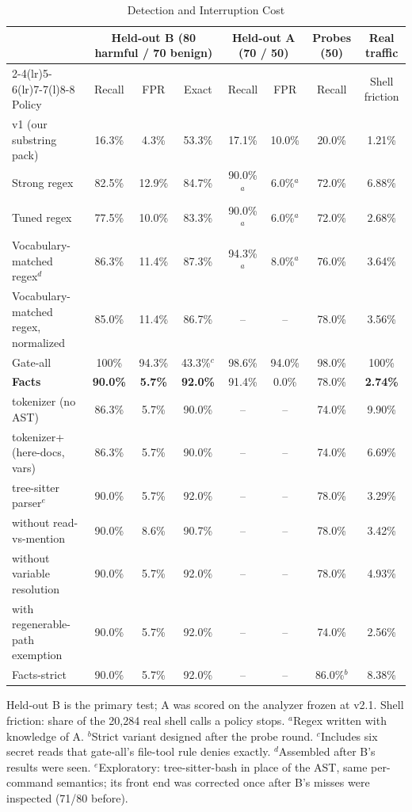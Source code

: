 \documentclass[conference]{IEEEtran}
\begin{document}
\begin{table}[t]
\caption{Detection and Interruption Cost}
\label{tab:main}
\centering\small
\begin{tabular}{@{}lccccccc@{}}
\toprule
 & \multicolumn{3}{c}{Held-out B (80 harmful / 70 benign)} & \multicolumn{2}{c}{Held-out A (70 / 50)} & Probes (50) & Real traffic \\
\cmidrule(lr){2-4}\cmidrule(lr){5-6}\cmidrule(lr){7-7}\cmidrule(l){8-8}
Policy & Recall & FPR & Exact & Recall & FPR & Recall & Shell friction \\
\midrule
v1 (our substring pack) & 16.3\% & 4.3\% & 53.3\% & 17.1\% & 10.0\% & 20.0\% & 1.21\% \\
Strong regex & 82.5\% & 12.9\% & 84.7\% & 90.0\%$^a$ & 6.0\%$^a$ & 72.0\% & 6.88\% \\
Tuned regex & 77.5\% & 10.0\% & 83.3\% & 90.0\%$^a$ & 6.0\%$^a$ & 72.0\% & 2.68\% \\
Vocabulary-matched regex$^d$ & 86.3\% & 11.4\% & 87.3\% & 94.3\%$^a$ & 8.0\%$^a$ & 76.0\% & 3.64\% \\
Vocabulary-matched regex, normalized & 85.0\% & 11.4\% & 86.7\% & -- & -- & 78.0\% & 3.56\% \\
Gate-all & 100\% & 94.3\% & 43.3\%$^c$ & 98.6\% & 94.0\% & 98.0\% & 100\% \\
\midrule
\textbf{Facts} & \textbf{90.0\%} & \textbf{5.7\%} & \textbf{92.0\%} & 91.4\% & 0.0\% & 78.0\% & \textbf{2.74\%} \\
\quad tokenizer (no AST) & 86.3\% & 5.7\% & 90.0\% & -- & -- & 74.0\% & 9.90\% \\
\quad tokenizer+ (here-docs, vars) & 86.3\% & 5.7\% & 90.0\% & -- & -- & 74.0\% & 6.69\% \\
\quad tree-sitter parser$^e$ & 90.0\% & 5.7\% & 92.0\% & -- & -- & 78.0\% & 3.29\% \\
\quad without read-vs-mention & 90.0\% & 8.6\% & 90.7\% & -- & -- & 78.0\% & 3.42\% \\
\quad without variable resolution & 90.0\% & 5.7\% & 92.0\% & -- & -- & 78.0\% & 4.93\% \\
\quad with regenerable-path exemption & 90.0\% & 5.7\% & 92.0\% & -- & -- & 74.0\% & 2.56\% \\
Facts-strict & 90.0\% & 5.7\% & 92.0\% & -- & -- & 86.0\%$^b$ & 8.38\% \\
\bottomrule
\end{tabular}\par\vspace{2pt}
\parbox{\textwidth}{\footnotesize Held-out B is the primary test; A was scored on the analyzer frozen at v2.1. Shell friction: share of the 20,284 real shell calls a policy stops. $^a$Regex written with knowledge of A. $^b$Strict variant designed after the probe round. $^c$Includes six secret reads that gate-all's file-tool rule denies exactly. $^d$Assembled after B's results were seen. $^e$Exploratory: tree-sitter-bash in place of the AST, same per-command semantics; its front end was corrected once after B's misses were inspected (71/80 before).}
\end{table}
\end{document}
